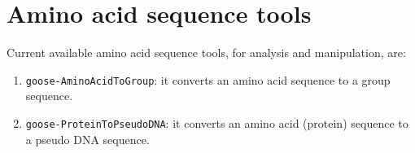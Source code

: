 \chapter{Amino acid sequence tools}
\label{seq}

Current available amino acid sequence tools, for analysis and manipulation, are:
\begin{enumerate}
\item \texttt{goose-AminoAcidToGroup}: it converts an amino acid sequence to a group 
sequence.
\item \texttt{goose-ProteinToPseudoDNA}: it converts an amino acid (protein) sequence to a pseudo DNA sequence.
\end{enumerate}



